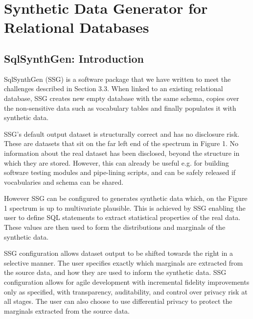 \documentclass[11pt]{article}
\begin{document}
\section{Synthetic Data Generator for Relational Databases}

\subsection{SqlSynthGen: Introduction}


SqlSynthGen (SSG) is a software package that we have written to meet the challenges described in Section 3.3. When linked to an existing relational database, SSG creates new empty database with the same schema, copies over the non-sensitive data such as vocabulary tables and finally populates it with synthetic data. 

SSG's default output dataset is structurally correct and has no disclosure risk. These are datasets that sit on the far left end of the spectrum in Figure 1. No information about the real dataset has been disclosed, beyond the structure in which they are stored. However, this can already be useful e.g. for building software testing modules and pipe-lining scripts, and can be safely released if vocabularies and schema can be shared.

However SSG can be configured to generates synthetic data which, on the Figure 1 spectrum is up to multivariate plausible. This is achieved by SSG enabling the user to define SQL statements to extract statistical properties of the real data. These values are then used to form the distributions and marginals of the synthetic data. 

SSG configuration allows dataset output to be shifted towards the right in a selective manner. The user specifies exactly which marginals are extracted from the source data, and how they are used to inform the synthetic data. SSG configuration allows for agile development with incremental fidelity improvements only as specified, with transparency, auditability, and control over privacy risk at all stages. The user can also choose to use differential privacy to protect the marginals extracted from the source data.
\end{document}
